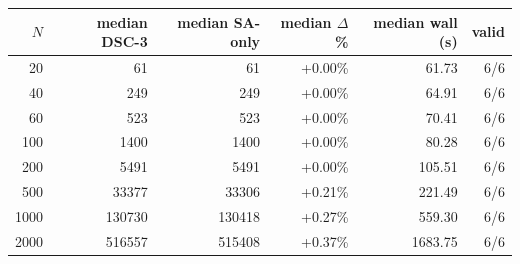 \begin{tabular}{rrrrrr}
\toprule
$N$ & median DSC-3 & median SA-only & median $\Delta$\% & median wall (s) & valid \\
\midrule
20 & 61 & 61 & +0.00\% & 61.73 & 6/6 \\
40 & 249 & 249 & +0.00\% & 64.91 & 6/6 \\
60 & 523 & 523 & +0.00\% & 70.41 & 6/6 \\
100 & 1400 & 1400 & +0.00\% & 80.28 & 6/6 \\
200 & 5491 & 5491 & +0.00\% & 105.51 & 6/6 \\
500 & 33377 & 33306 & +0.21\% & 221.49 & 6/6 \\
1000 & 130730 & 130418 & +0.27\% & 559.30 & 6/6 \\
2000 & 516557 & 515408 & +0.37\% & 1683.75 & 6/6 \\
\bottomrule
\end{tabular}
